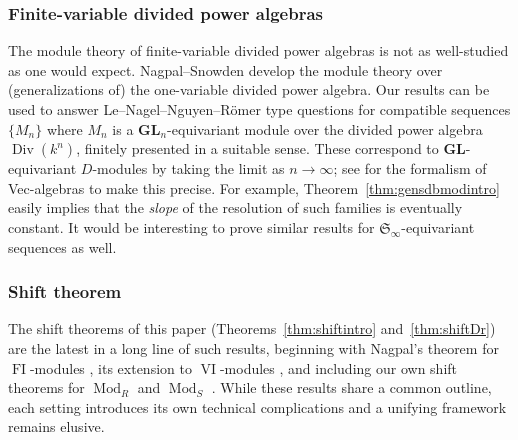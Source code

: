 \documentclass[12pt]{amsart}
\newcommand{\fS}{\mathfrak{S}}
\DeclareMathOperator{\Div}{Div}
\DeclareMathOperator{\Mod}{Mod}
\DeclareMathOperator{\FI}{FI}
\DeclareMathOperator{\VI}{VI}
\newcommand{\GL}{\mathbf{GL}}
\numberwithin{equation}{section}
\theoremstyle{definition}
\theoremstyle{plain}
\begin{document}
\subsubsection{Finite-variable divided power algebras}
The module theory of finite-variable divided power algebras is not as well-studied as one would expect. Nagpal--Snowden \cite{ns17div} develop the module theory over (generalizations of) the one-variable divided power algebra. Our results can be used to answer Le--Nagel--Nguyen--R\"omer \cite{lnnr20pdim, lnnr21reg} type questions for compatible sequences $\{M_n\}$ where $M_n$ is a $\GL_n$-equivariant module over the divided power algebra $\Div(k^n)$, finitely presented in a suitable sense. 
These correspond to $\GL$-equivariant $D$-modules by taking the limit as $n \to \infty$; see \cite[Section~2.1]{gan24lnnr} for the formalism of Vec-algebras to make this precise. For example, Theorem~\ref{thm:gensdbmodintro} easily implies that the \textit{slope} of the resolution of such families is eventually constant. It would be interesting to prove similar results for $\fS_{\infty}$-equivariant sequences as well.

\subsubsection{Shift theorem}
The shift theorems of this paper (Theorems~\ref{thm:shiftintro} and~\ref{thm:shiftDr}) are the latest in a long line of such results, beginning with Nagpal's theorem for $\FI$-modules \cite{nag15fi}, its extension to $\VI$-modules \cite{nag19vi}, and including our own shift theorems for $\Mod_R$ and $\Mod_S$ \cite{gan22ext, gan25pol}. While these results share a common outline, each setting introduces its own technical complications and a unifying framework remains elusive.
\end{document}
